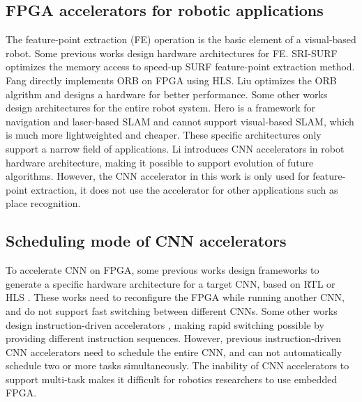\subsection{ FPGA accelerators for robotic applications }

The feature-point extraction (FE) operation is the basic element of a visual-based robot.
Some previous works design hardware architectures for FE.
SRI-SURF \cite{jia2016sri} optimizes the memory access to speed-up SURF \cite{bay2006surf} feature-point extraction method. 
Fang \cite{fang2017fpga} directly implements ORB on FPGA using HLS. Liu \cite{liu2019eslam} optimizes the ORB algrithm and designs a hardware for better performance.
Some other works design architectures for the entire robot system. Hero \cite{shi2018hero} is a framework for navigation and laser-based SLAM and cannot support visual-based SLAM, which is much more lightweighted and cheaper. These specific architectures only support a narrow field of applications. 
Li \cite{li2019879gops} introduces CNN accelerators in robot hardware architecture, making it possible to support evolution of future algorithms. However, the CNN accelerator in this work is only used for feature-point extraction, it does not use the accelerator for other applications such as place recognition.



\subsection{ Scheduling mode of CNN accelerators }

To accelerate CNN on FPGA, some previous works design frameworks to generate a specific hardware architecture for a target CNN, based on  RTL \cite{li_high_2016} or HLS \cite{lu_evaluating_2017}. These works need to reconfigure the FPGA while running another CNN, and do not support fast switching between different CNNs. Some other works design instruction-driven accelerators \cite{yu2018instruction,qiu2016going}, making rapid switching possible by providing different instruction sequences. However, previous instruction-driven CNN accelerators need to schedule the entire CNN, and can not automatically schedule two or more tasks simultaneously. The inability of CNN accelerators to support multi-task makes it difficult for robotics researchers to use embedded FPGA.